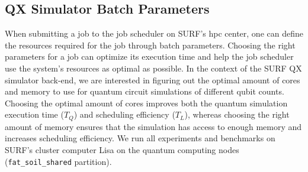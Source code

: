 \subsection{QX Simulator Batch Parameters}
When submitting a job to the job scheduler on SURF's \gls{hpc} center, one can define the resources required for the job through batch parameters.
Choosing the right parameters for a job can optimize its execution time and help the job scheduler use the system's resources as optimal as possible.
In the context of the SURF QX simulator back-end, we are interested in figuring out the optimal amount of cores and memory to use for quantum circuit simulations of different qubit counts.
Choosing the optimal amount of cores improves both the quantum simulation execution time ($T_Q$) and scheduling efficiency ($T_L$), whereas choosing the right amount of memory ensures that the simulation has access to enough memory and increases scheduling efficiency.
We run all experiments and benchmarks on SURF's cluster computer Lisa on the quantum computing nodes (\texttt{fat_soil_shared} partition).

